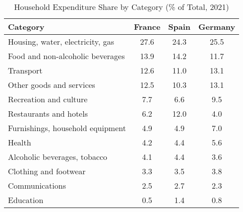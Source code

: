 \documentclass[12pt,a4paper]{article}%
\begin{document}
\begin{table}[h]
\centering
\caption{Household Expenditure Share by Category (\% of Total, 2021)}
\label{tab:appendix_expenditure}
\begin{tabular}{lccc}
\hline
\textbf{Category} & \textbf{France} & \textbf{Spain} & \textbf{Germany}\\
\hline
Housing, water, electricity, gas & 27.6 & 24.3 & 25.5\\
Food and non-alcoholic beverages & 13.9 & 14.2 & 11.7\\
Transport & 12.6 & 11.0 & 13.1\\
Other goods and services & 12.5 & 10.3 & 13.1\\
Recreation and culture & 7.7 & 6.6 & 9.5\\
Restaurants and hotels & 6.2 & 12.0 & 4.0\\
Furnishings, household equipment & 4.9 & 4.9 & 7.0\\
Health & 4.2 & 4.4 & 5.6\\
Alcoholic beverages, tobacco & 4.1 & 4.4 & 3.6\\
Clothing and footwear & 3.3 & 3.5 & 3.8\\
Communications & 2.5 & 2.7 & 2.3\\
Education & 0.5 & 1.4 & 0.8\\
\hline
\end{tabular}
\end{table}
\end{document}
